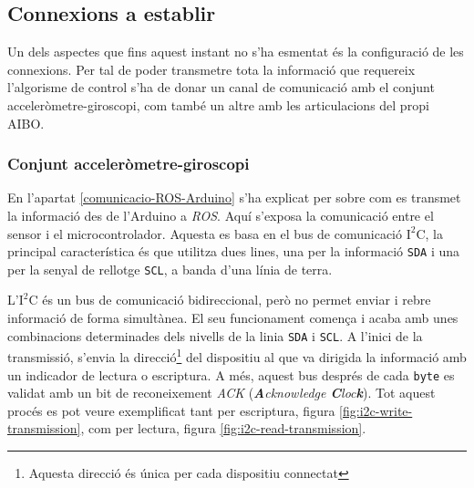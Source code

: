 \documentclass[12pt,a4paper,final,twoside]{article}
\begin{document}
\subsection{Connexions a establir}

Un dels aspectes que fins aquest instant no s'ha esmentat és la configuració de les connexions. Per tal de poder transmetre tota la informació que requereix l'algorisme de control s'ha de donar un canal de comunicació amb el conjunt acceleròmetre-giroscopi, com també un altre amb les articulacions del propi AIBO.

\subsubsection{Conjunt acceleròmetre-giroscopi}

En l'apartat \ref{comunicacio-ROS-Arduino} s'ha explicat per sobre com es transmet la informació des de l'Arduino a \textit{ROS}. Aquí s'exposa la comunicació entre el sensor i el microcontrolador. Aquesta es basa en el bus de comunicació $\mathrm{I^2C}$, la principal característica és que utilitza dues lines, una per la informació \texttt{SDA} i una per la senyal de rellotge \texttt{SCL}, a banda d'una línia de terra. 

L'$\mathrm{I^2C}$ és un bus de comunicació bidireccional, però no permet enviar i rebre informació de forma simultànea. El seu funcionament comença i acaba amb unes combinacions determinades dels nivells de la linia \texttt{SDA} i \texttt{SCL}. A l'inici de la transmissió, s'envia la direcció\footnote{Aquesta direcció és única per cada dispositiu connectat} del dispositiu al que va dirigida la informació amb un indicador de lectura o escriptura. A més, aquest bus després de cada \texttt{byte} es validat amb un bit de reconeixement \textit{ACK} (\textit{\textbf{A}cknowledge \textbf{C}loc\textbf{k}}). Tot aquest procés es pot veure exemplificat tant per escriptura, figura \ref{fig:i2c-write-transmission}, com per lectura, figura \ref{fig:i2c-read-transmission}.

\end{document}
